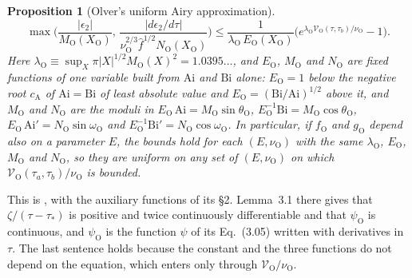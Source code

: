\documentclass[aps,prd,onecolumn,tightenlines,nofootinbib,notitlepage,11pt,floatfix]{revtex4-2}
\theoremstyle{indentedtheorem}
\newtheorem{proposition}{Proposition}
\begin{document}
\begin{proposition}[Olver's uniform Airy approximation]
\begin{equation*}
    \max\Big(\frac{|\epsilon_2|}{M_\text{O}(X_\text{O})},\,\frac{|d\epsilon_2/d\tau|}{\nu_\text{O}^{2/3}\hat{f}^{1/2}N_\text{O}(X_\text{O})}\Big) \leq \frac{1}{\lambda_\text{O}\,E_\text{O}(X_\text{O})}\Big(e^{\lambda_\text{O}\mathcal{V}_\text{O}(\tau,\tau_b)/\nu_\text{O}}-1\Big) .
\end{equation*}
Here $\lambda_\text{O}\equiv\sup_X\pi|X|^{1/2}M_\text{O}(X)^2=1.0395\ldots$, and $E_\text{O}$, $M_\text{O}$ and $N_\text{O}$ are fixed functions of one variable built from $\mathrm{Ai}$ and $\mathrm{Bi}$ alone: $E_\text{O}=1$ below the negative root $c_\text{A}$ of $\mathrm{Ai}=\mathrm{Bi}$ of least absolute value and $E_\text{O}=(\mathrm{Bi}/\mathrm{Ai})^{1/2}$ above it, and $M_\text{O}$ and $N_\text{O}$ are the moduli in $E_\text{O}\,\mathrm{Ai}=M_\text{O}\sin\theta_\text{O}$, $E_\text{O}^{-1}\mathrm{Bi}=M_\text{O}\cos\theta_\text{O}$, $E_\text{O}\,\mathrm{Ai}'=N_\text{O}\sin\omega_\text{O}$ and $E_\text{O}^{-1}\mathrm{Bi}'=N_\text{O}\cos\omega_\text{O}$. In particular, if $f_\text{O}$ and $g_\text{O}$ depend also on a parameter $E$, the bounds hold for each $(E,\nu_\text{O})$ with the same $\lambda_\text{O}$, $E_\text{O}$, $M_\text{O}$ and $N_\text{O}$, so they are uniform on any set of $(E,\nu_\text{O})$ on which $\mathcal{V}_\text{O}(\tau_a,\tau_b)/\nu_\text{O}$ is bounded.
\end{proposition}

\noindent This is \citet[Ch.~11, Lemma~3.1 and Theorem~3.1]{Olver1974Asymptotics}, with the auxiliary functions of its \S2. Lemma~3.1 there gives that $\zeta/(\tau-\tau_*)$ is positive and twice continuously differentiable and that $\psi_\text{O}$ is continuous, and $\psi_\text{O}$ is the function $\psi$ of its Eq.~(3.05) written with derivatives in $\tau$. The last sentence holds because the constant and the three functions do not depend on the equation, which enters only through $\mathcal{V}_\text{O}/\nu_\text{O}$.
\end{document}
